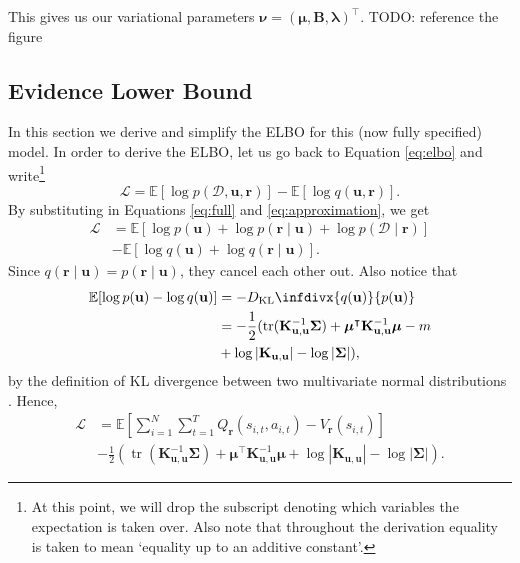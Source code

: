 \documentclass{mpaper}
\DeclareMathOperator{\tr}{tr}
\newcommand{\DKL}{D_{\mathrm{KL}}\infdivx}
\newcommand{\V}{V_{\mathbf{r}}}
\newcommand{\Kuu}{\mathbf{K}_{\mathbf{u},\mathbf{u}}}
\newcommand{\pfull}{p(\mathcal{D}, \mathbf{u}, \mathbf{r})}
\newcommand{\approximation}{q(\mathbf{u}, \mathbf{r})}
\begin{document}
This gives us our variational parameters $\bm\nu = (\bm\mu, \mathbf{B},
\bm\lambda)^\intercal$. TODO: reference the figure


\subsection{Evidence Lower Bound} \label{sec:elbo}

In this section we derive and simplify the ELBO for this (now fully specified)
model. In order to derive the ELBO, let us go back to Equation \ref{eq:elbo} and
write\footnote{At this point, we will drop the subscript denoting which
  variables the expectation is taken over. Also note that throughout the
  derivation equality is taken to mean `equality up to an additive constant'.}
\[
  \mathcal{L} = \mathbb{E}[\log\pfull] - \mathbb{E}[\log\approximation].
\]
By substituting in Equations \ref{eq:full} and \ref{eq:approximation}, we get
\begin{align*}
  \mathcal{L} &= \mathbb{E}[\log p(\mathbf{u}) + \log p(\mathbf{r} \mid \mathbf{u}) + \log p(\mathcal{D} \mid \mathbf{r})] \\
              &- \mathbb{E}[\log q(\mathbf{u}) + \log q(\mathbf{r} \mid \mathbf{u})].
\end{align*}
Since $q(\mathbf{r} \mid \mathbf{u}) = p(\mathbf{r} \mid \mathbf{u})$, they
cancel each other out. Also notice that
\begin{align*}
  \mathbb{E}[\log p(\mathbf{u}) - \log q(\mathbf{u})] &= -\DKL{q(\mathbf{u})}{p(\mathbf{u})} \\
                                                      &= -\frac{1}{2} (\tr (\Kuu^{-1}\bm\Sigma) + \bm\mu^\intercal\Kuu^{-1}\bm\mu - m \\
                                                      &+ \log |\Kuu| - \log |\bm\Sigma|),
\end{align*}
by the definition of KL divergence between two multivariate normal distributions
\cite{kl}. Hence,
\begin{align*}
  \mathcal{L} &= \mathbb{E}\left[ \sum_{i=1}^N \sum_{t=1}^T Q_{\mathbf{r}}(s_{i,t}, a_{i,t}) - \V(s_{i,t}) \right] \\
              &- \frac{1}{2} \left(\tr \left( \Kuu^{-1}\bm\Sigma \right) + \bm\mu^\intercal\Kuu^{-1}\bm\mu + \log |\Kuu| - \log |\bm\Sigma| \right).
\end{align*}
\end{document}
